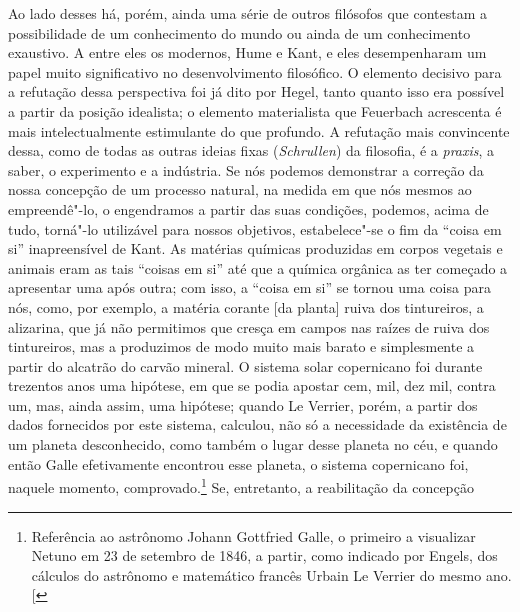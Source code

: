 Ao lado desses há, porém, ainda uma série de outros filósofos que
contestam a possibilidade de um conhecimento do mundo ou ainda de um
conhecimento exaustivo. A entre eles os
modernos, Hume e Kant,
e eles desempenharam um papel muito significativo no desenvolvimento
filosófico. O elemento decisivo para a refutação dessa perspectiva foi
já dito
por Hegel,
tanto quanto isso era possível a partir da posição idealista; o elemento
materialista
que Feuerbach acrescenta
é mais intelectualmente estimulante do que profundo. A refutação mais
convincente dessa, como de todas as outras ideias fixas
(\emph{Schrullen}) da filosofia, é a \emph{praxis}, a saber, o
experimento e a indústria. Se nós podemos demonstrar a correção da nossa
concepção de um processo natural, na medida em que nós mesmos ao
empreendê"-lo, o engendramos a partir das suas condições, podemos, acima
de tudo, torná"-lo utilizável para nossos objetivos, estabelece"-se o fim
da ``coisa em si'' inapreensível
de Kant.
As matérias químicas produzidas em corpos vegetais e animais eram as
tais ``coisas em si'' até que a química orgânica as ter começado a
apresentar uma após outra; com isso, a ``coisa em si'' se tornou uma
coisa para nós, como, por exemplo, a matéria corante {[}da planta{]}
ruiva dos tintureiros, a alizarina, que já não permitimos que cresça em
campos nas raízes de ruiva dos tintureiros, mas a produzimos de modo
muito mais barato e simplesmente a partir do alcatrão do carvão mineral.
O sistema solar copernicano foi durante trezentos anos uma hipótese, em
que se podia apostar cem, mil, dez mil, contra um, mas, ainda assim, uma
hipótese; quando Le Verrier, porém, a partir dos dados fornecidos por
este sistema, calculou, não só a necessidade da existência de um planeta
desconhecido, como também o lugar desse planeta no céu, e quando então
Galle efetivamente encontrou esse planeta,
o sistema copernicano foi, naquele momento, comprovado.\footnote{Referência ao astrônomo Johann Gottfried Galle, o primeiro a
  visualizar Netuno em 23 de setembro de 1846, a partir, como indicado
  por Engels, dos cálculos do astrônomo e matemático francês Urbain Le
  Verrier do mesmo ano. {[}\versal{N.\,T.}{]}} Se, entretanto, a reabilitação da concepção
